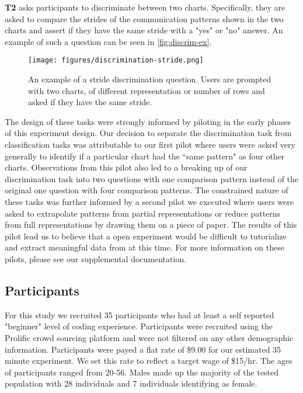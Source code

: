 \textbf{T2} asks participants to discriminate between two charts. Specifically, they are asked to compare the strides of the communication patterns shown in the two charts and assert if they have the same stride with a "yes" or "no" answer. An example of such a question can be seen in \autoref{fig:discrim-ex}.
    
    \begin{figure}
        \centering
        \texttt{[image: figures/discrimination-stride.png]}
        \caption{An example of a stride discrimination question. Users are prompted with two charts, of different representation or number of rows and asked if they have the same stride.}
        \label{fig:discrim-ex}
    \end{figure}
    
    The design of these tasks were strongly informed by piloting in the early phases of this experiment design. Our decision to separate the discrimination task from classification tasks was attributable to our first pilot where users were asked very generally to identify if a particular chart had the ``same pattern" as four other charts. Observations from this pilot also led to a breaking up of our discrimination task into two questions with one comparison pattern instead of the original one question with four comparison patterns. The constrained nature of these tasks was further informed by a second pilot we executed where users were asked to extrapolate patterns from partial representations or reduce patterns from full representations by drawing them on a piece of paper. The results of this pilot lead us to believe that a open experiment would be difficult to tutorialize and extract meaningful data from at this time. For more information on these pilots, please see our supplemental documentation. 
    

\subsection{Participants}
    For this study we recruited 35 participants who had at least a self reported "beginner" level of coding experience.
    Participants were recruited using the Prolific crowd sourcing platform and were not filtered on any other demographic information. Participants were payed a flat rate of \$9.00 for our estimated 35 minute experiment. We set this rate to reflect a target wage of \$15/hr. The ages of participants ranged from 20-56. Males made up the majority of the tested population with 28 individuals and 7 individuals identifying as female.
    
